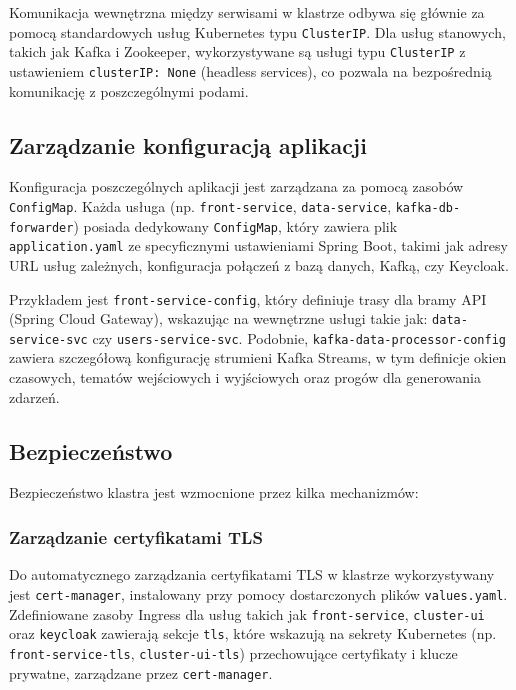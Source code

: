 Komunikacja wewnętrzna między serwisami w klastrze odbywa się głównie za pomocą standardowych usług Kubernetes typu \texttt{ClusterIP}. Dla usług stanowych, takich jak Kafka i Zookeeper, wykorzystywane są usługi typu \texttt{ClusterIP} z ustawieniem \texttt{clusterIP: None} (headless services), co pozwala na bezpośrednią komunikację z poszczególnymi podami.

\subsection{Zarządzanie konfiguracją aplikacji}

Konfiguracja poszczególnych aplikacji jest zarządzana za pomocą zasobów \texttt{ConfigMap}. Każda usługa (np. \texttt{front-service}, \texttt{data-service}, \texttt{kafka-db-forwarder}) posiada dedykowany \texttt{ConfigMap}, który zawiera plik \texttt{application.yaml} ze specyficznymi ustawieniami Spring Boot, takimi jak adresy URL usług zależnych, konfiguracja połączeń z bazą danych, Kafką, czy Keycloak.

Przykładem jest \texttt{front-service-config}, który definiuje trasy dla bramy API (Spring Cloud Gateway), wskazując na wewnętrzne usługi takie jak: \texttt{data-service-svc} czy \texttt{users-service-svc}. Podobnie, \texttt{kafka-data-processor-config} zawiera szczegółową konfigurację strumieni Kafka Streams, w tym definicje okien czasowych, tematów wejściowych i wyjściowych oraz progów dla generowania zdarzeń.

\subsection{Bezpieczeństwo}

Bezpieczeństwo klastra jest wzmocnione przez kilka mechanizmów:

\subsubsection{Zarządzanie certyfikatami TLS}
Do automatycznego zarządzania certyfikatami TLS w klastrze wykorzystywany jest \texttt{cert-manager}, instalowany przy pomocy dostarczonych plików \texttt{values.yaml}. Zdefiniowane zasoby Ingress dla usług takich jak \texttt{front-service}, \texttt{cluster-ui} oraz \texttt{keycloak} zawierają sekcje \texttt{tls}, które wskazują na sekrety Kubernetes (np. \texttt{front-service-tls}, \texttt{cluster-ui-tls}) przechowujące certyfikaty i klucze prywatne, zarządzane przez \texttt{cert-manager}.


